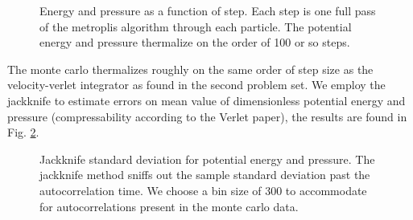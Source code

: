 \documentclass[singlepage,notitlepage,nofootinbib,11pt]{revtex4-1}
\begin{document}
\begin{figure}[h]
  \centering
  \captionsetup[subfigure]{labelformat=empty}
  \caption{\label{energypressure} Energy and pressure as a function of step. Each step is one full pass of the metroplis algorithm through each particle. The potential energy and pressure thermalize on the order of 100 or so steps.}
\end{figure}
The monte carlo thermalizes roughly on the same order of step size as the velocity-verlet integrator as found in the second problem set. We employ the jackknife to estimate errors on mean value of dimensionless potential energy and pressure (compressability according to the Verlet paper), the results are found in Fig. \ref{jacks}.
\begin{figure}[h]
  \centering
  \captionsetup[subfigure]{labelformat=empty}
  \caption{\label{jacks} Jackknife standard deviation for potential energy and pressure. The jackknife method sniffs out the sample standard deviation past the autocorrelation time. We choose a bin size of 300 to accommodate for autocorrelations present in the monte carlo data.}
\end{figure}
\end{document}
